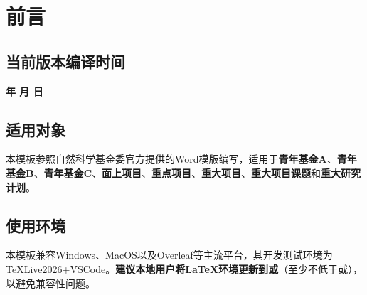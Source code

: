 \documentclass[QingNianC, vlined, timesmathnogreek]{nsfc}
\begin{document}






	\newpage

	\newcommand{\shad}[1]{\textcolor{DodgerBlue}{\ttfamily #1}}
	\newcommand{\shadcmd}[1]{\shad{$\backslash$#1}}


	\section{前言}
	\subsection{当前版本编译时间}
	\noindent%
	\begin{center}%
		\bfseries\color{DarkRed}%
		\zhdigits*{\the\year} 年\zhnumber{\the\month} 月\zhnumber{\the\day} 日\;\xxivtime
	\end{center}

	\subsection{适用对象}
	
	本模板参照自然科学基金委官方提供的Word模版编写，适用于\textbf{青年基金A}、\textbf{青年基金B}、\textbf{青年基金C}、\textbf{面上项目}、\textbf{重点项目}、\textbf{重大项目}、\textbf{重大项目课题}和\textbf{重大研究计划}。

	\subsection{使用环境}

	本模板兼容Windows、MacOS以及Overleaf等主流平台，其开发测试环境为TeXLive2026+VSCode。\textbf{建议本地用户将LaTeX环境更新到\href{https://mirrors.tuna.tsinghua.edu.cn/CTAN/systems/texlive/Images/}{\color{DarkRed}}或\href{https://mirrors.tuna.tsinghua.edu.cn/tex-historic-archive/systems/mactex/2026/}{\color{DarkRed}}}（至少不低于\href{https://mirrors.tuna.tsinghua.edu.cn/tex-historic-archive/systems/texlive/}{\color{DarkRed}}或\href{https://mirrors.tuna.tsinghua.edu.cn/tex-historic-archive/systems/mactex/}{\color{DarkRed}}），以避免兼容性问题。
\end{document}
